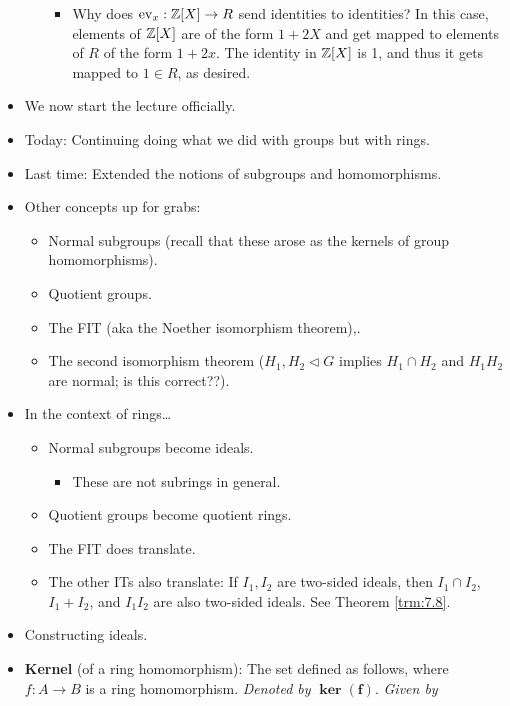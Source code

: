 \documentclass[../notes.tex]{subfiles}
\begin{document}
\begin{itemize}
\begin{itemize}
        \begin{itemize}
            \item Why does $\operatorname{ev}_x:\mathbb{Z}[X]\to R$ send identities to identities? In this case, elements of $\mathbb{Z}[X]$ are of the form $1+2X$ and get mapped to elements of $R$ of the form $1+2x$. The identity in $\mathbb{Z}[X]$ is 1, and thus it gets mapped to $1\in R$, as desired.
        \end{itemize}
    \end{itemize}
    \item We now start the lecture officially.
    \item Today: Continuing doing what we did with groups but with rings.
    \item Last time: Extended the notions of subgroups and homomorphisms.
    \item Other concepts up for grabs:
    \begin{itemize}
        \item Normal subgroups (recall that these arose as the kernels of group homomorphisms).
        \item Quotient groups.
        \item The FIT (aka the Noether isomorphism theorem),.
        \item The second isomorphism theorem ($H_1,H_2\triangleleft G$ implies $H_1\cap H_2$ and $H_1H_2$ are normal; is this correct??).
    \end{itemize}
    \item In the context of rings\dots
    \begin{itemize}
        \item Normal subgroups become ideals.
        \begin{itemize}
            \item These are not subrings in general.
        \end{itemize}
        \item Quotient groups become quotient rings.
        \item The FIT does translate.
        \item The other ITs also translate: If $I_1,I_2$ are two-sided ideals, then $I_1\cap I_2$, $I_1+I_2$, and $I_1I_2$ are also two-sided ideals. See Theorem \ref{trm:7.8}.
    \end{itemize}
    \item Constructing ideals.
    \item \textbf{Kernel} (of a ring homomorphism): The set defined as follows, where $f:A\to B$ is a ring homomorphism. \emph{Denoted by} $\bm{\ker(f)}$. \emph{Given by}

\end{itemize}
\end{document}
